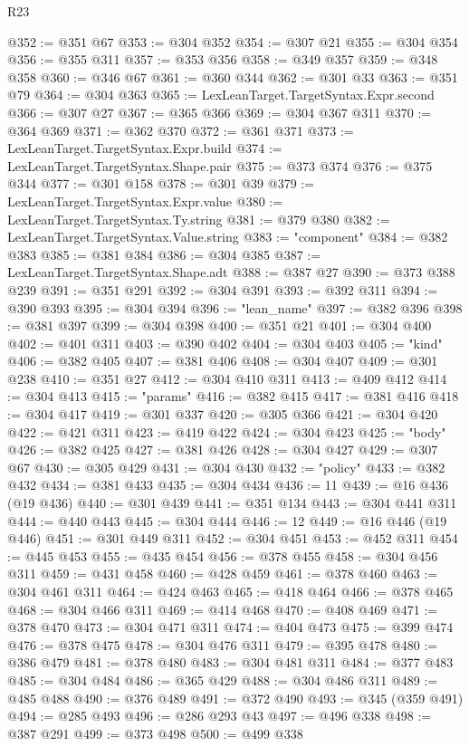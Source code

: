\begin{lexlean}{R23}
\begin{coremodule}
@352 := @351 @67
@353 := @304 @352
@354 := @307 @21
@355 := @304 @354
@356 := @355 @311
@357 := @353 @356
@358 := @349 @357
@359 := @348 @358
@360 := @346 @67
@361 := @360 @344
@362 := @301 @33
@363 := @351 @79
@364 := @304 @363
@365 := LexLeanTarget.TargetSyntax.Expr.second
@366 := @307 @27
@367 := @365 @366
@369 := @304 @367 @311
@370 := @364 @369
@371 := @362 @370
@372 := @361 @371
@373 := LexLeanTarget.TargetSyntax.Expr.build
@374 := LexLeanTarget.TargetSyntax.Shape.pair
@375 := @373 @374
@376 := @375 @344
@377 := @301 @158
@378 := @301 @39
@379 := LexLeanTarget.TargetSyntax.Expr.value
@380 := LexLeanTarget.TargetSyntax.Ty.string
@381 := @379 @380
@382 := LexLeanTarget.TargetSyntax.Value.string
@383 := "component"
@384 := @382 @383
@385 := @381 @384
@386 := @304 @385
@387 := LexLeanTarget.TargetSyntax.Shape.adt
@388 := @387 @27
@390 := @373 @388 @239
@391 := @351 @291
@392 := @304 @391
@393 := @392 @311
@394 := @390 @393
@395 := @304 @394
@396 := "lean_name"
@397 := @382 @396
@398 := @381 @397
@399 := @304 @398
@400 := @351 @21
@401 := @304 @400
@402 := @401 @311
@403 := @390 @402
@404 := @304 @403
@405 := "kind"
@406 := @382 @405
@407 := @381 @406
@408 := @304 @407
@409 := @301 @238
@410 := @351 @27
@412 := @304 @410 @311
@413 := @409 @412
@414 := @304 @413
@415 := "params"
@416 := @382 @415
@417 := @381 @416
@418 := @304 @417
@419 := @301 @337
@420 := @305 @366
@421 := @304 @420
@422 := @421 @311
@423 := @419 @422
@424 := @304 @423
@425 := "body"
@426 := @382 @425
@427 := @381 @426
@428 := @304 @427
@429 := @307 @67
@430 := @305 @429
@431 := @304 @430
@432 := "policy"
@433 := @382 @432
@434 := @381 @433
@435 := @304 @434
@436 := 11
@439 := @16 @436 (@19 @436)
@440 := @301 @439
@441 := @351 @134
@443 := @304 @441 @311
@444 := @440 @443
@445 := @304 @444
@446 := 12
@449 := @16 @446 (@19 @446)
@451 := @301 @449 @311
@452 := @304 @451
@453 := @452 @311
@454 := @445 @453
@455 := @435 @454
@456 := @378 @455
@458 := @304 @456 @311
@459 := @431 @458
@460 := @428 @459
@461 := @378 @460
@463 := @304 @461 @311
@464 := @424 @463
@465 := @418 @464
@466 := @378 @465
@468 := @304 @466 @311
@469 := @414 @468
@470 := @408 @469
@471 := @378 @470
@473 := @304 @471 @311
@474 := @404 @473
@475 := @399 @474
@476 := @378 @475
@478 := @304 @476 @311
@479 := @395 @478
@480 := @386 @479
@481 := @378 @480
@483 := @304 @481 @311
@484 := @377 @483
@485 := @304 @484
@486 := @365 @429
@488 := @304 @486 @311
@489 := @485 @488
@490 := @376 @489
@491 := @372 @490
@493 := @345 (@359 @491)
@494 := @285 @493
@496 := @286 @293 @43
@497 := @496 @338
@498 := @387 @291
@499 := @373 @498
@500 := @499 @338

\end{coremodule}
\end{lexlean}
